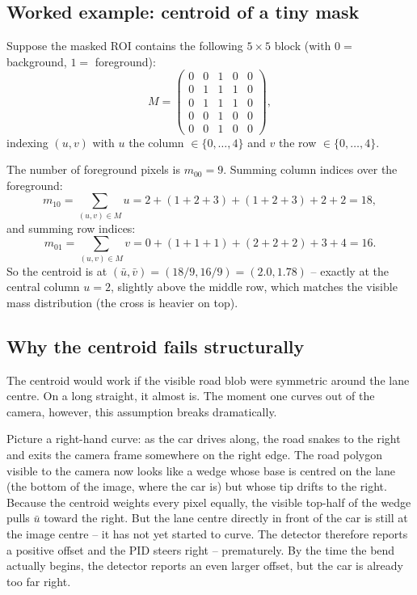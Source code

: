 \subsection{Worked example: centroid of a tiny mask}

\begin{example}
Suppose the masked ROI contains the following $5\times 5$ block
(with $0=$ background, $1=$ foreground):
\[
M = \begin{pmatrix}
0 & 0 & 1 & 0 & 0\\
0 & 1 & 1 & 1 & 0\\
0 & 1 & 1 & 1 & 0\\
0 & 0 & 1 & 0 & 0\\
0 & 0 & 1 & 0 & 0
\end{pmatrix},
\]
indexing $(u,v)$ with $u$ the column $\in\{0,\ldots,4\}$ and $v$ the
row $\in\{0,\ldots,4\}$.

The number of foreground pixels is $m_{00}=9$. Summing column indices
over the foreground:
\[
m_{10} = \sum_{(u,v)\in M} u = 2 + (1+2+3) + (1+2+3) + 2 + 2 = 18,
\]
and summing row indices:
\[
m_{01} = \sum_{(u,v)\in M} v = 0 + (1+1+1) + (2+2+2) + 3 + 4 = 16.
\]
So the centroid is at $(\bar u,\bar v) = (18/9, 16/9) = (2.0, 1.78)$
-- exactly at the central column $u=2$, slightly above the middle row,
which matches the visible mass distribution (the cross is heavier on
top).
\end{example}

\subsection{Why the centroid fails structurally}

The centroid would work if the visible road blob were symmetric around
the lane centre. On a long straight, it almost is. The moment one
curves out of the camera, however, this assumption breaks dramatically.

Picture a right-hand curve: as the car drives along, the road snakes
to the right and exits the camera frame somewhere on the right edge.
The road polygon visible to the camera now looks like a wedge whose
base is centred on the lane (the bottom of the image, where the car
is) but whose tip drifts to the right. Because the centroid weights
every pixel equally, the visible top-half of the wedge pulls $\bar u$
toward the right. But the lane centre directly in front of the car is
still at the image centre -- it has not yet started to curve. The
detector therefore reports a positive offset and the PID steers right
-- prematurely. By the time the bend actually begins, the detector
reports an even larger offset, but the car is already too far right.

